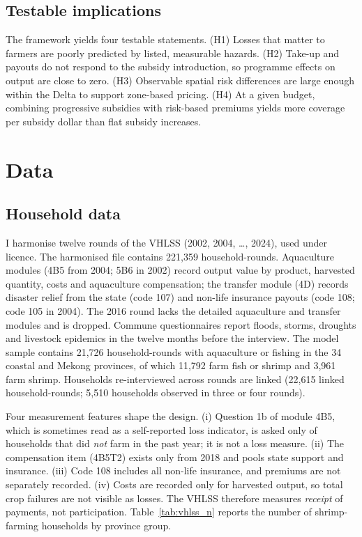 \documentclass[11pt,a4paper]{article}
\begin{document}
\subsection{Testable implications}

The framework yields four testable statements. (H1) Losses that matter to farmers are poorly predicted by listed, measurable hazards. (H2) Take-up and payouts do not respond to the subsidy introduction, so programme effects on output are close to zero. (H3) Observable spatial risk differences are large enough within the Delta to support zone-based pricing. (H4) At a given budget, combining progressive subsidies with risk-based premiums yields more coverage per subsidy dollar than flat subsidy increases.

\section{Data}
\label{sec:data}

\subsection{Household data}

I harmonise twelve rounds of the VHLSS (2002, 2004, \ldots, 2024), used under licence. The harmonised file contains 221,359 household-rounds. Aquaculture modules (4B5 from 2004; 5B6 in 2002) record output value by product, harvested quantity, costs and aquaculture compensation; the transfer module (4D) records disaster relief from the state (code 107) and non-life insurance payouts (code 108; code 105 in 2004). The 2016 round lacks the detailed aquaculture and transfer modules and is dropped. Commune questionnaires report floods, storms, droughts and livestock epidemics in the twelve months before the interview. The model sample contains 21,726 household-rounds with aquaculture or fishing in the 34 coastal and Mekong provinces, of which 11,792 farm fish or shrimp and 3,961 farm shrimp. Households re-interviewed across rounds are linked (22,615 linked household-rounds; 5,510 households observed in three or four rounds).

Four measurement features shape the design. (i) Question 1b of module 4B5, which is sometimes read as a self-reported loss indicator, is asked only of households that did \emph{not} farm in the past year; it is not a loss measure. (ii) The compensation item (4B5T2) exists only from 2018 and pools state support and insurance. (iii) Code 108 includes all non-life insurance, and premiums are not separately recorded. (iv) Costs are recorded only for harvested output, so total crop failures are not visible as losses. The VHLSS therefore measures \emph{receipt} of payments, not participation. Table~\ref{tab:vhlss_n} reports the number of shrimp-farming households by province group.
\end{document}
